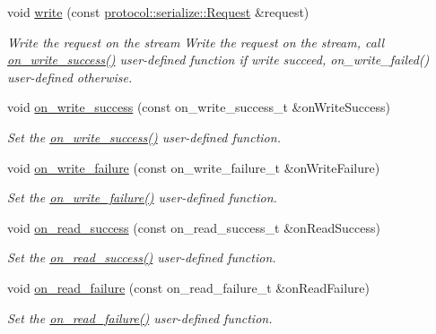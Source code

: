 \begin{DoxyCompactItemize}
void \hyperlink{classprotocol_1_1_output_connection_ae457c098638ab42cf1b6ece7f277e72d}{write} (const \hyperlink{structprotocol_1_1serialize_1_1_request}{protocol\+::serialize\+::\+Request} \&request)
\begin{DoxyCompactList}\small\item\em Write the request on the stream Write the request on the stream, call \hyperlink{classprotocol_1_1_output_connection_a98750b6398a6280fc778e5c0fb0ea14e}{on\+\_\+write\+\_\+success()} user-\/defined function if write succeed, on\+\_\+write\+\_\+failed() user-\/defined otherwise. \end{DoxyCompactList}\item 
void \hyperlink{classprotocol_1_1_output_connection_a98750b6398a6280fc778e5c0fb0ea14e}{on\+\_\+write\+\_\+success} (const on\+\_\+write\+\_\+success\+\_\+t \&on\+Write\+Success)
\begin{DoxyCompactList}\small\item\em Set the \hyperlink{classprotocol_1_1_output_connection_a98750b6398a6280fc778e5c0fb0ea14e}{on\+\_\+write\+\_\+success()} user-\/defined function. \end{DoxyCompactList}\item 
void \hyperlink{classprotocol_1_1_output_connection_a2c70a552249924bd75e0fe472722c1fc}{on\+\_\+write\+\_\+failure} (const on\+\_\+write\+\_\+failure\+\_\+t \&on\+Write\+Failure)
\begin{DoxyCompactList}\small\item\em Set the \hyperlink{classprotocol_1_1_output_connection_a2c70a552249924bd75e0fe472722c1fc}{on\+\_\+write\+\_\+failure()} user-\/defined function. \end{DoxyCompactList}\item 
void \hyperlink{classprotocol_1_1_output_connection_a3592638f2e736b85d0cd094d94bacdcf}{on\+\_\+read\+\_\+success} (const on\+\_\+read\+\_\+success\+\_\+t \&on\+Read\+Success)
\begin{DoxyCompactList}\small\item\em Set the \hyperlink{classprotocol_1_1_output_connection_a3592638f2e736b85d0cd094d94bacdcf}{on\+\_\+read\+\_\+success()} user-\/defined function. \end{DoxyCompactList}\item 
void \hyperlink{classprotocol_1_1_output_connection_aa3e70f574e6db59202aa4a9cdcad7216}{on\+\_\+read\+\_\+failure} (const on\+\_\+read\+\_\+failure\+\_\+t \&on\+Read\+Failure)
\begin{DoxyCompactList}\small\item\em Set the \hyperlink{classprotocol_1_1_output_connection_aa3e70f574e6db59202aa4a9cdcad7216}{on\+\_\+read\+\_\+failure()} user-\/defined function. \end{DoxyCompactList}\item 

\end{DoxyCompactItemize}

